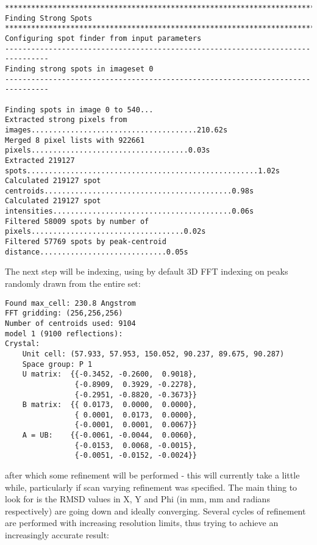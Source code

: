 \documentclass[a4paper, 11pt]{article}
\begin{document}
{\small
\begin{verbatim}
********************************************************************************
Finding Strong Spots
********************************************************************************
Configuring spot finder from input parameters
--------------------------------------------------------------------------------
Finding strong spots in imageset 0
--------------------------------------------------------------------------------

Finding spots in image 0 to 540...
Extracted strong pixels from images......................................210.62s
Merged 8 pixel lists with 922661 pixels....................................0.03s
Extracted 219127 spots.....................................................1.02s
Calculated 219127 spot centroids...........................................0.98s
Calculated 219127 spot intensities.........................................0.06s
Filtered 58009 spots by number of pixels...................................0.02s
Filtered 57769 spots by peak-centroid distance.............................0.05s
\end{verbatim}
}

\noindent
The next step will be indexing, using by default 3D FFT indexing on
peaks randomly drawn from the entire set:

{\small
\begin{verbatim}
Found max_cell: 230.8 Angstrom
FFT gridding: (256,256,256)
Number of centroids used: 9104
model 1 (9100 reflections):
Crystal:
    Unit cell: (57.933, 57.953, 150.052, 90.237, 89.675, 90.287)
    Space group: P 1
    U matrix:  {{-0.3452, -0.2600,  0.9018},
                {-0.8909,  0.3929, -0.2278},
                {-0.2951, -0.8820, -0.3673}}
    B matrix:  {{ 0.0173,  0.0000,  0.0000},
                { 0.0001,  0.0173,  0.0000},
                {-0.0001,  0.0001,  0.0067}}
    A = UB:    {{-0.0061, -0.0044,  0.0060},
                {-0.0153,  0.0068, -0.0015},
                {-0.0051, -0.0152, -0.0024}}
\end{verbatim}
}

\noindent
after which some refinement will be performed - this will currently
take a little while, particularly if scan varying refinement was
specified. The main thing to look for is the RMSD values in X, Y and
Phi (in mm, mm and radians respectively) are going down and ideally
converging. Several cycles of refinement are performed with increasing
resolution limits, thus trying to achieve an increasingly accurate
result:
\end{document}

